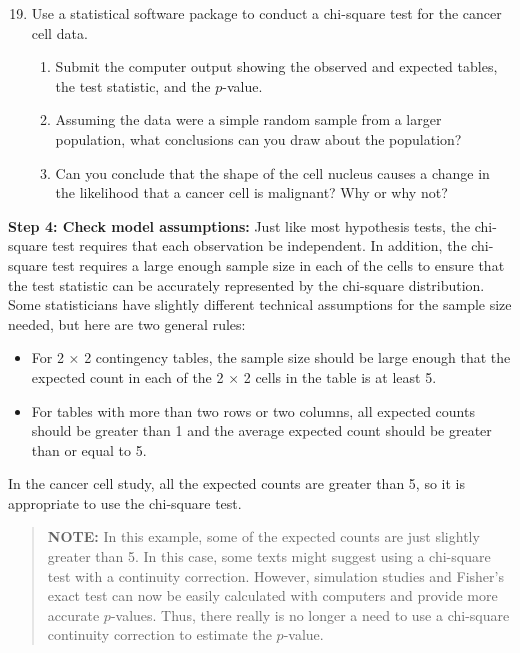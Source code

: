 \documentclass[
]{report}
\providecommand{\tightlist}{%
  \setlength{\itemsep}{0pt}\setlength{\parskip}{0pt}}
\begin{document}
\begin{enumerate}
  \setcounter{enumi}{18}

  \item Use a statistical software package to conduct a chi-square test for the cancer cell data.
\begin{enumerate}
  \item Submit the computer output showing the observed and expected tables, the test statistic, and the $\scriptstyle p$-value.
  \item Assuming the data were a simple random sample from a larger population, what conclusions can you draw about the population?
  \item Can you conclude that the shape of the cell nucleus causes a change in the likelihood that a cancer cell is malignant? Why or why not?
\end{enumerate}
\end{enumerate}

\textbf{Step 4: Check model assumptions:}
Just like most hypothesis tests, the chi-square test requires that each observation be independent. In addition, the chi-square test requires a large enough sample size in each of the cells to ensure that the test statistic can be accurately represented by the chi-square distribution. Some statisticians have slightly different technical assumptions for the sample size needed, but here are two general rules:

\begin{itemize}
\tightlist
\item
  For 2 × 2 contingency tables, the sample size should be large enough that the expected count in each of the 2 × 2 cells in the table is at least 5.\\
\item
  For tables with more than two rows or two columns, all expected counts should be greater than 1 and the average expected count should be greater than or equal to 5.
\end{itemize}

In the cancer cell study, all the expected counts are greater than 5, so it is appropriate to use the chi-square test.

\begin{quote}
\textbf{NOTE:} In this example, some of the expected counts are just slightly greater than 5. In this case, some texts might suggest using a chi-square test with a continuity correction. However, simulation studies and Fisher's exact test can now be easily calculated with computers and provide more accurate \(\scriptstyle p\)-values. Thus, there really is no longer a need to use a chi-square continuity correction to estimate the \(\scriptstyle p\)-value.
\end{quote}
\end{document}
